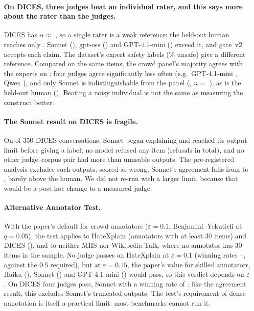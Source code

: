 \paragraph{On DICES, three judges beat an individual rater, and this says more about the rater than the judges.} DICES has $\alpha\approx$ \alphaDthree, so a single rater is a weak reference: the held-out human reaches only \jHumanDthree. Sonnet (\jSonnetDthree), gpt-oss (\jOssDthree) and GPT-4.1-mini (\jGptDthree) exceed it, and gate~v2 accepts each claim. The dataset's expert safety labels (\expertPrev\% unsafe) give a different reference. Compared on the same items, the crowd panel's majority agrees with the experts on \exMPanel; four judges agree significantly less often (e.g.\ GPT-4.1-mini \exMDiffGpt [\exMLoGpt, \exMHiGpt], Qwen \exMDiffQwen [\exMLoQwen, \exMHiQwen]), and only Sonnet is indistinguishable from the panel (\exMDiffSonnet [\exMLoSonnet, \exMHiSonnet], $n=$ \exMNSonnet), as is the held-out human (\exMDiffHuman [\exMLoHuman, \exMHiHuman]). Beating a noisy individual is not the same as measuring the construct better.

\paragraph{The Sonnet result on DICES is fragile.} On \jSonnetDthreeUnparsed of 350 DICES conversations, Sonnet began explaining and reached its output limit before giving a label; no model refused any item (\jRefusals refusals in total), and no other judge--corpus pair had more than \jOtherInvalidMax unusable outputs. The pre-registered analysis excludes such outputs; scored as wrong, Sonnet's agreement falls from \jSonnetDthree to \jSonnetDthreeInvalidWrong, barely above the human. We did not re-run with a larger limit, because that would be a post-hoc change to a measured judge.

\paragraph{Alternative Annotator Test.} With the paper's default for crowd annotators ($\varepsilon=0.1$, Benjamini--Yekutieli at $q=0.05$), the test applies to HateXplain (\altAnnotHx annotators with at least 30 items) and DICES (\altAnnotDthree), and to neither MHS nor Wikipedia Talk, where no annotator has 30 items in the sample. No judge passes on HateXplain at $\varepsilon=0.1$ (winning rates \altQwenHx--\altHaikuHx, against the 0.5 required), but at $\varepsilon=0.15$, the paper's value for skilled annotators, Haiku (\altEpsHighHaikuHx), Sonnet (\altEpsHighSonnetHx) and GPT-4.1-mini (\altEpsHighGptHx) would pass, so this verdict depends on $\varepsilon$. On DICES four judges pass, Sonnet with a winning rate of \altSonnetDthree; like the agreement result, this excludes Sonnet's truncated outputs. The test's requirement of dense annotation is itself a practical limit: most benchmarks cannot run it.

